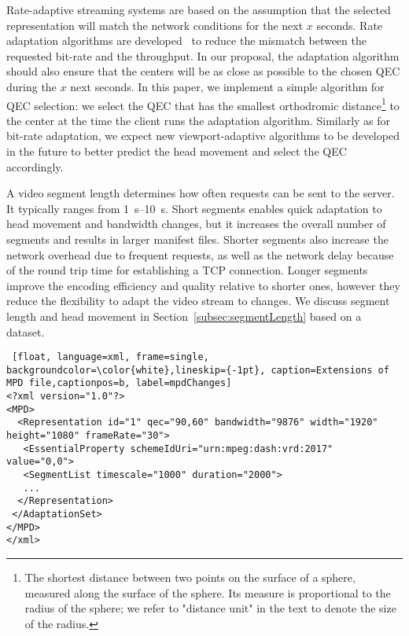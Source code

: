 Rate-adaptive streaming systems are based on the assumption that
the selected representation will match the network
conditions for the next $x$ seconds. Rate adaptation algorithms
are
developed~\cite{tian,probe_li_2014,miller,zou,liu} to reduce the mismatch between the
requested bit-rate and the throughput. In our proposal, the adaptation algorithm should also ensure
that the \FoV{} centers will be as close as possible to the chosen \ac{QEC} during
the $x$ next seconds.
In this paper, we implement
a simple algorithm for \ac{QEC} selection: we select the \ac{QEC} that
has the smallest orthodromic distance\footnote{The shortest distance
between two points on the surface of a sphere, measured along the
surface of the sphere. Its measure is proportional to the radius
of the sphere; we refer to "distance unit" in the text to denote the
size of the radius.} to the \FoV{} center at the time the client runs
the adaptation algorithm. Similarly as for bit-rate adaptation, we
expect new viewport-adaptive algorithms to be developed in
the future to better predict the head movement and select the
\ac{QEC} accordingly.



A video segment length determines how
often requests can be sent to the server. It typically ranges from
\SIrange{1}{10}{\second}. Short segments enables quick
adaptation to head movement and bandwidth changes, but it increases
the overall number of segments and results in larger manifest files.
Shorter segments also increase the network overhead due to
frequent requests, as well as the network delay because of the round
trip time for establishing a TCP connection.
Longer segments improve the encoding efficiency and quality relative to
shorter ones, however they reduce the flexibility to adapt the video
stream to changes. We discuss segment length and head movement in
Section~\ref{subsec:segmentLength} based on a dataset.



\begin{lstlisting} [float, language=xml, frame=single, backgroundcolor=\color{white},lineskip={-1pt}, caption=Extensions of MPD file,captionpos=b, label=mpdChanges]
<?xml version="1.0"?>
<MPD>
  <Representation id="1" qec="90,60" bandwidth="9876" width="1920" height="1080" frameRate="30">
   <EssentialProperty schemeIdUri="urn:mpeg:dash:vrd:2017" value="0,0">
   <SegmentList timescale="1000" duration="2000">
   ...
  </Representation>
 </AdaptationSet>
</MPD>
</xml>
\end{lstlisting}


